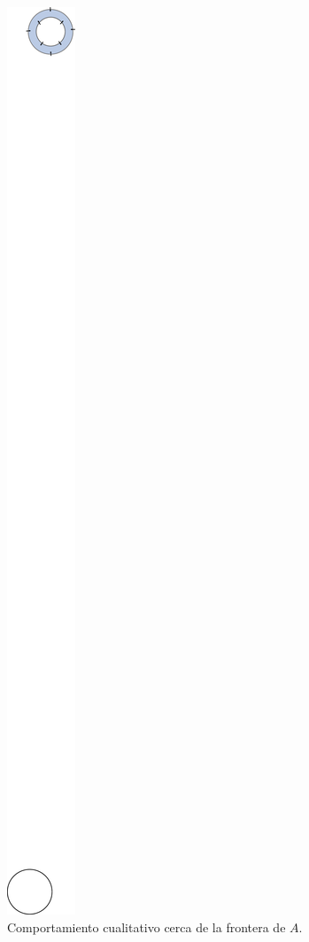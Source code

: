 \begin{example}
\begin{figure}[!ht] \centering
	\includegraphics[scale=1.0]{figures/expoincarebendixson2.pdf}
	\caption{Comportamiento cualitativo cerca de la frontera de $A$.}
	\label{fig:expoincarebendixson2}
\end{figure}

\end{example}
	